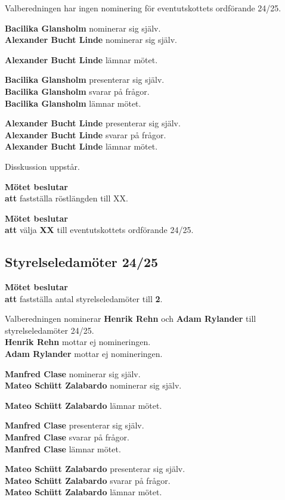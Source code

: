 \documentclass{datateknologsektionen-document}
\newcommand{\ind}{\hspace*{2em}}
\newcommand{\motetbeslutar}{\textbf{Mötet beslutar}}
\newcommand{\att}{\\\ind\textbf{att}}
\begin{document}
Valberedningen har ingen nominering för eventutskottets ordförande 24/25.

\textbf{Bacilika Glansholm} nominerar sig själv. \\
\textbf{Alexander Bucht Linde} nominerar sig själv. 

\textbf{Alexander Bucht Linde} lämnar mötet.

\textbf{Bacilika Glansholm} presenterar sig själv.\\
\textbf{Bacilika Glansholm} svarar på frågor.\\
\textbf{Bacilika Glansholm} lämnar mötet.

\textbf{Alexander Bucht Linde} presenterar sig själv.\\
\textbf{Alexander Bucht Linde} svarar på frågor.\\
\textbf{Alexander Bucht Linde} lämnar mötet.

Disskussion uppstår.

\motetbeslutar
\att{} fastställa röstlängden till XX.

\motetbeslutar
\att{} välja \textbf{XX} till eventutskottets ordförande 24/25.

\subsection{Styrelseledamöter 24/25}

\motetbeslutar
\att{} fastställa antal styrelseledamöter till \textbf{2}.

Valberedningen nominerar \textbf{Henrik Rehn} och \textbf{Adam Rylander} till styrelseledamöter 24/25. \\
\textbf{Henrik Rehn} mottar ej nomineringen. \\
\textbf{Adam Rylander} mottar ej nomineringen.

\textbf{Manfred Clase} nominerar sig själv. \\
\textbf{Mateo Schütt Zalabardo} nominerar sig själv. 

\textbf{Mateo Schütt Zalabardo} lämnar mötet.

\textbf{Manfred Clase} presenterar sig själv.\\
\textbf{Manfred Clase} svarar på frågor.\\
\textbf{Manfred Clase} lämnar mötet.

\textbf{Mateo Schütt Zalabardo} presenterar sig själv.\\
\textbf{Mateo Schütt Zalabardo} svarar på frågor.\\
\textbf{Mateo Schütt Zalabardo} lämnar mötet.
\end{document}
